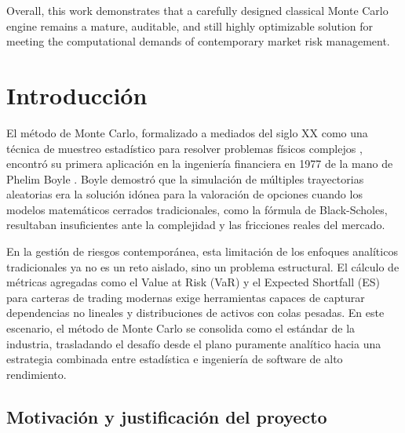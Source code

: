 \documentclass[11pt]{article}
\begin{document}
Overall, this work demonstrates that a carefully designed classical Monte Carlo engine remains a mature, auditable, and still highly optimizable solution for meeting the computational demands of contemporary market risk management.

\newpage

\tableofcontents

\newpage









\section{Introducción}

El método de Monte Carlo, formalizado a mediados del siglo XX como una técnica de muestreo estadístico para resolver problemas físicos complejos \cite{metropolis1949monte, ulam1976adventures, segre1970fermi}, encontró su primera aplicación en la ingeniería financiera en 1977 de la mano de Phelim Boyle \cite{boyle1977options}. Boyle demostró que la simulación de múltiples trayectorias aleatorias era la solución idónea para la valoración de opciones cuando los modelos matemáticos cerrados tradicionales, como la fórmula de Black-Scholes, resultaban insuficientes ante la complejidad y las fricciones reales del mercado.

En la gestión de riesgos contemporánea, esta limitación de los enfoques analíticos tradicionales ya no es un reto aislado, sino un problema estructural. El cálculo de métricas agregadas como el Value at Risk (VaR) \cite{jpmorgan1994riskmetrics} y el Expected Shortfall (ES) \cite{acerbi2002coherence} para carteras de trading modernas exige herramientas capaces de capturar dependencias no lineales y distribuciones de activos con colas pesadas. En este escenario, el método de Monte Carlo se consolida como el estándar de la industria, trasladando el desafío desde el plano puramente analítico hacia una estrategia combinada entre estadística e ingeniería de software de alto rendimiento.

\subsection{Motivación y justificación del proyecto}
\end{document}

